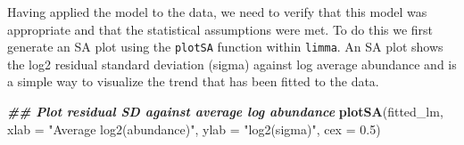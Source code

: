 \documentclass[9pt,a4paper,]{extarticle}
\newenvironment{Shaded}{\begin{snugshade}}{\end{snugshade}}
\newcommand{\AttributeTok}[1]{\textcolor[rgb]{0.13,0.29,0.53}{#1}}
\newcommand{\ConstantTok}[1]{\textcolor[rgb]{0.56,0.35,0.01}{#1}}
\newcommand{\DocumentationTok}[1]{\textcolor[rgb]{0.56,0.35,0.01}{\textbf{\textit{#1}}}}
\newcommand{\FloatTok}[1]{\textcolor[rgb]{0.00,0.00,0.81}{#1}}
\newcommand{\FunctionTok}[1]{\textcolor[rgb]{0.13,0.29,0.53}{\textbf{#1}}}
\newcommand{\NormalTok}[1]{#1}
\newcommand{\OtherTok}[1]{\textcolor[rgb]{0.56,0.35,0.01}{#1}}
\newcommand{\SpecialCharTok}[1]{\textcolor[rgb]{0.81,0.36,0.00}{\textbf{#1}}}
\newcommand{\StringTok}[1]{\textcolor[rgb]{0.31,0.60,0.02}{#1}}
\begin{document}
\begin{Shaded}
\end{Shaded}

Having applied the model to the data, we need to verify that this model was
appropriate and that the statistical assumptions were met. To do this we first
generate an SA plot using the \texttt{plotSA} function within \texttt{limma}. An SA plot shows
the log2 residual standard deviation (sigma) against log average abundance and
is a simple way to visualize the trend that has been fitted to the data.

\begin{Shaded}
\begin{Highlighting}[]
\DocumentationTok{\#\# Plot residual SD against average log abundance}
\FunctionTok{plotSA}\NormalTok{(fitted\_lm,}
       \AttributeTok{xlab =} \StringTok{"Average log2(abundance)"}\NormalTok{,}
       \AttributeTok{ylab =} \StringTok{"log2(sigma)"}\NormalTok{,}
       \AttributeTok{cex =} \FloatTok{0.5}\NormalTok{)}
\end{Highlighting}
\end{Shaded}
\end{document}
